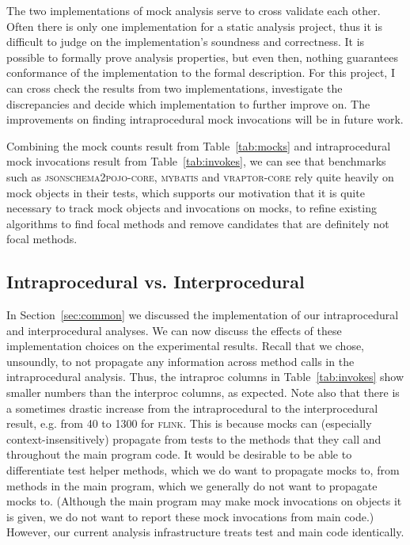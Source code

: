 The two implementations of mock analysis serve to cross validate each other. Often there is only one implementation for a static analysis project, thus it is difficult to judge on the implementation's soundness and correctness. It is possible to formally prove analysis properties, but even then, nothing guarantees conformance of the implementation to the formal description. For this project, I can cross check the results from two implementations, investigate the discrepancies and decide which implementation to further improve on. The improvements on finding intraprocedural mock invocations will be in future work.

Combining the mock counts result from Table~\ref{tab:mocks} and intraprocedural mock invocations result from Table~\ref{tab:invokes}, we can see that benchmarks such as \textsc{jsonschema2pojo-core}, \textsc{mybatis} and \textsc{vraptor-core} rely quite heavily on mock objects in their tests, which supports our motivation that it is quite necessary to track mock objects and invocations on mocks, to refine existing algorithms to find focal methods and remove candidates that are definitely not focal methods. 


\subsection{Intraprocedural vs. Interprocedural}

In Section~\ref{sec:common} we discussed the implementation of our intraprocedural and interprocedural analyses. We can now discuss the effects of these implementation choices on the experimental results. Recall that we chose, unsoundly, to not propagate any information across method calls in the intraprocedural analysis. Thus, the intraproc columns in Table~\ref{tab:invokes} show smaller numbers than the interproc columns, as expected. Note also that there is a sometimes drastic increase from the intraprocedural to the interprocedural result, e.g. from 40 to 1300 for \textsc{flink}. This is because mocks can (especially context-insensitively) propagate from tests to the methods that they call and throughout the main program code. It would be desirable to be able to differentiate test helper methods, which we do want to propagate mocks to, from methods in the main program, which we generally do not want to propagate mocks to. (Although the main program may make mock invocations on objects it is given, we do not want to report these mock invocations from main code.) However, our current analysis infrastructure treats test and main code identically. 

